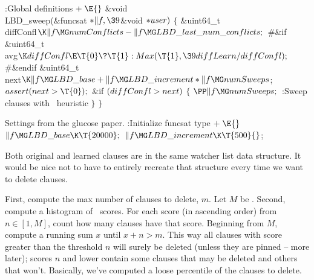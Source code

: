 {{{{{\Y\B\4:Global definitions\X${}\mathrel+\E{}$\6
\&{void} \\{LBD\_sweep}(\&{funcsat} ${}{*}\|f,\39{}$\&{void} ${}{*}\\{user}){}$%
\1\1\2\2\6
${}\{{}$\1\6
\&{uint64\_t} \\{diffConfl}${}\K\|f\MG\\{numConflicts}-\|f\MG\\{LBD\_last\_num%
\_conflicts};{}$\6
\8\#\&{if} \6
\&{uint64\_t} \\{avg}${}\K\\{diffConfl}\E\T{0}\?\T{1}:\\{Max}(\T{1},\39%
\\{diffLearn}/\\{diffConfl});{}$\6
\8\#\&{endif}\6
\&{uint64\_t} \\{next}${}\K\|f\MG\\{LBD\_base}+\|f\MG\\{LBD\_increment}*\|f\MG%
\\{numSweeps}{}$;\7
${}\\{assert}(\\{next}>\T{0});{}$\6
\&{if} ${}(\\{diffConfl}>\\{next}){}$\5
${}\{{}$\1\6
${}\PP\|f\MG\\{numSweeps};{}$\6
:Sweep clauses with \LBD\ heuristic\X\6
\4${}\}{}$\2\6
\4${}\}{}$\2\par
\fi

Settings from the glucose paper.
\Y\B\4:Initialize funcsat type\X${}\mathrel+\E{}$\6
$\|f\MG\\{LBD\_base}\K\T{20000};{}$\6
${}\|f\MG\\{LBD\_increment}\K\T{500}{}$;\par
\fi

Both original and learned clauses are in the same watcher list data
structure. It would be nice not to have to entirely recreate that structure
every time we want to delete clauses.

First, compute the max number of clauses to delete, $m$. Let $M$ be
. Second, compute a histogram of \LBD\ scores. For each
score (in
ascending order) from $n \in [1,M]$, count how many clauses have that
score. Beginning from $M$, compute a running sum $x$ until $x+n > m$. This way
all clauses with score greater than the threshold $n$ will surely be deleted
(unless they are pinned -- more later); scores $n$ and lower contain some
clauses that may be deleted and others that won't. Basically, we've computed a
loose percentile of the clauses to delete.

}}}}}
